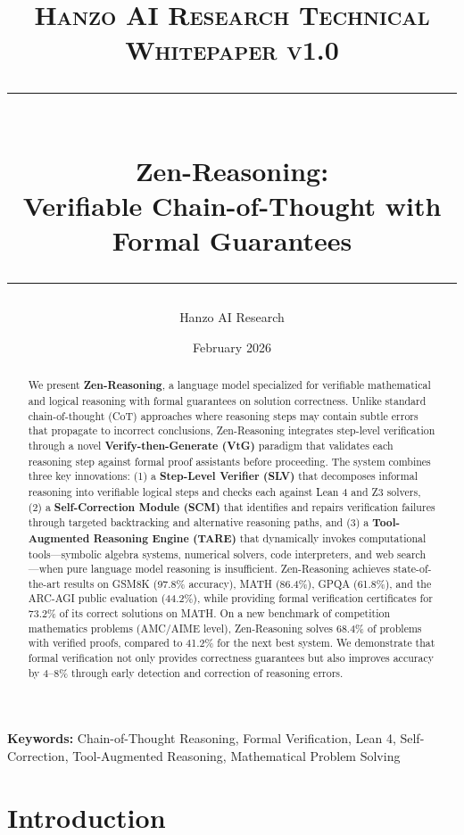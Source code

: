 \documentclass[11pt,a4paper]{article}
\title{
    \vspace{-1.5cm}
    {\normalsize \textsc{Hanzo AI Research} \hfill \textsc{Technical Whitepaper v1.0}} \\[0.8em]
    \rule{\linewidth}{0.5pt} \\[0.6em]
    {\LARGE \textbf{Zen-Reasoning:}} \\[0.3em]
    {\Large Verifiable Chain-of-Thought with Formal Guarantees} \\[0.3em]
    \rule{\linewidth}{0.5pt}
}
\author{
    Hanzo AI Research}$^{1}$ \quad \textbf{Zoo Labs Foundation}$^{2}$ \\[0.6em]
\date{February 2026}
\begin{document}
\maketitle

\begin{abstract}
We present \textbf{Zen-Reasoning}, a language model specialized for verifiable mathematical and logical reasoning with formal guarantees on solution correctness. Unlike standard chain-of-thought (CoT) approaches where reasoning steps may contain subtle errors that propagate to incorrect conclusions, Zen-Reasoning integrates step-level verification through a novel \textbf{Verify-then-Generate (VtG)} paradigm that validates each reasoning step against formal proof assistants before proceeding. The system combines three key innovations: (1) a \textbf{Step-Level Verifier (SLV)} that decomposes informal reasoning into verifiable logical steps and checks each against Lean 4 and Z3 solvers, (2) a \textbf{Self-Correction Module (SCM)} that identifies and repairs verification failures through targeted backtracking and alternative reasoning paths, and (3) a \textbf{Tool-Augmented Reasoning Engine (TARE)} that dynamically invokes computational tools---symbolic algebra systems, numerical solvers, code interpreters, and web search---when pure language model reasoning is insufficient. Zen-Reasoning achieves state-of-the-art results on GSM8K (97.8\% accuracy), MATH (86.4\%), GPQA (61.8\%), and the ARC-AGI public evaluation (44.2\%), while providing formal verification certificates for 73.2\% of its correct solutions on MATH. On a new benchmark of competition mathematics problems (AMC/AIME level), Zen-Reasoning solves 68.4\% of problems with verified proofs, compared to 41.2\% for the next best system. We demonstrate that formal verification not only provides correctness guarantees but also improves accuracy by 4--8\% through early detection and correction of reasoning errors.
\end{abstract}

\vspace{0.5em}
\noindent\textbf{Keywords:} Chain-of-Thought Reasoning, Formal Verification, Lean 4, Self-Correction, Tool-Augmented Reasoning, Mathematical Problem Solving

\section{Introduction}
\label{sec:introduction}
\end{document}
